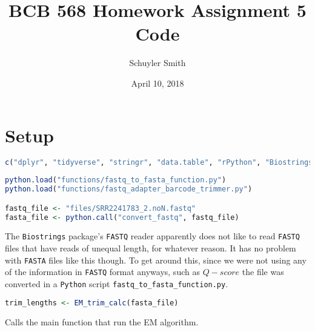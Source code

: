 \documentclass[12pt]{article}
\begin{document}
\setlength{\parindent}{0pt}
\title{\vspace{-1.5cm}
BCB 568 Homework Assignment 5 Code}
\author{Schuyler Smith}
\date{April 10, 2018}
\maketitle
\section*{Setup}
  \begin{lstlisting}[language=R]
c("dplyr", "tidyverse", "stringr", "data.table", "rPython", "Biostrings")
  \end{lstlisting}
  
  \begin{lstlisting}[language=R]
python.load("functions/fastq_to_fasta_function.py")
python.load("functions/fastq_adapter_barcode_trimmer.py")

fastq_file <- "files/SRR2241783_2.noN.fastq"
fasta_file <- python.call("convert_fastq", fastq_file)
  \end{lstlisting}
  The \texttt{Biostrings} package's \texttt{FASTQ} reader apparently does not like to read \texttt{FASTQ} files that have reads of unequal length, for whatever reason. It has no problem with \texttt{FASTA} files like this though. To get around this, since we were not using any of the information in \texttt{FASTQ} format anyways, such as $Q-score$ the file was converted in a \texttt{Python} script \texttt{fastq\_to\_fasta\_function.py}.

  \begin{lstlisting}[language=R]
trim_lengths <- EM_trim_calc(fasta_file)
  \end{lstlisting}
Calls the main function that run the EM algorithm.\\
\end{document}
